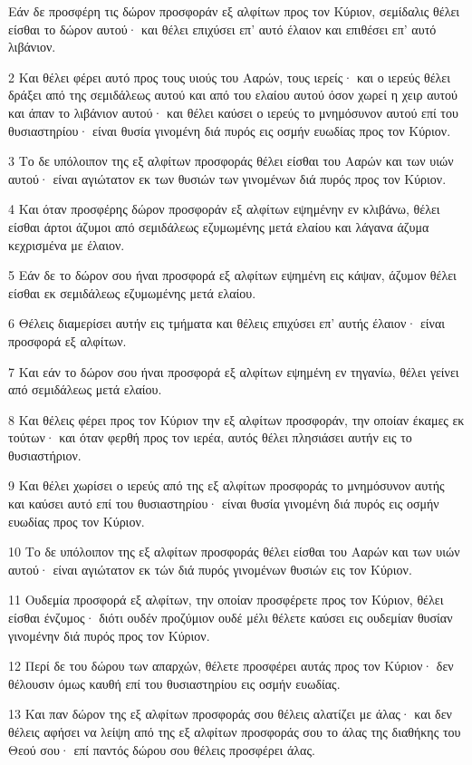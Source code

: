 \par Εάν δε προσφέρη τις δώρον προσφοράν εξ αλφίτων προς τον Κύριον, σεμίδαλις θέλει είσθαι το δώρον αυτού· και θέλει επιχύσει επ' αυτό έλαιον και επιθέσει επ' αυτό λιβάνιον.
\par 2 Και θέλει φέρει αυτό προς τους υιούς του Ααρών, τους ιερείς· και ο ιερεύς θέλει δράξει από της σεμιδάλεως αυτού και από του ελαίου αυτού όσον χωρεί η χειρ αυτού και άπαν το λιβάνιον αυτού· και θέλει καύσει ο ιερεύς το μνημόσυνον αυτού επί του θυσιαστηρίου· είναι θυσία γινομένη διά πυρός εις οσμήν ευωδίας προς τον Κύριον.
\par 3 Το δε υπόλοιπον της εξ αλφίτων προσφοράς θέλει είσθαι του Ααρών και των υιών αυτού· είναι αγιώτατον εκ των θυσιών των γινομένων διά πυρός προς τον Κύριον.
\par 4 Και όταν προσφέρης δώρον προσφοράν εξ αλφίτων εψημένην εν κλιβάνω, θέλει είσθαι άρτοι άζυμοι από σεμιδάλεως εζυμωμένης μετά ελαίου και λάγανα άζυμα κεχρισμένα με έλαιον.
\par 5 Εάν δε το δώρον σου ήναι προσφορά εξ αλφίτων εψημένη εις κάψαν, άζυμον θέλει είσθαι εκ σεμιδάλεως εζυμωμένης μετά ελαίου.
\par 6 Θέλεις διαμερίσει αυτήν εις τμήματα και θέλεις επιχύσει επ' αυτής έλαιον· είναι προσφορά εξ αλφίτων.
\par 7 Και εάν το δώρον σου ήναι προσφορά εξ αλφίτων εψημένη εν τηγανίω, θέλει γείνει από σεμιδάλεως μετά ελαίου.
\par 8 Και θέλεις φέρει προς τον Κύριον την εξ αλφίτων προσφοράν, την οποίαν έκαμες εκ τούτων· και όταν φερθή προς τον ιερέα, αυτός θέλει πλησιάσει αυτήν εις το θυσιαστήριον.
\par 9 Και θέλει χωρίσει ο ιερεύς από της εξ αλφίτων προσφοράς το μνημόσυνον αυτής και καύσει αυτό επί του θυσιαστηρίου· είναι θυσία γινομένη διά πυρός εις οσμήν ευωδίας προς τον Κύριον.
\par 10 Το δε υπόλοιπον της εξ αλφίτων προσφοράς θέλει είσθαι του Ααρών και των υιών αυτού· είναι αγιώτατον εκ τών διά πυρός γινομένων θυσιών εις τον Κύριον.
\par 11 Ουδεμία προσφορά εξ αλφίτων, την οποίαν προσφέρετε προς τον Κύριον, θέλει είσθαι ένζυμος· διότι ουδέν προζύμιον ουδέ μέλι θέλετε καύσει εις ουδεμίαν θυσίαν γινομένην διά πυρός προς τον Κύριον.
\par 12 Περί δε του δώρου των απαρχών, θέλετε προσφέρει αυτάς προς τον Κύριον· δεν θέλουσιν όμως καυθή επί του θυσιαστηρίου εις οσμήν ευωδίας.
\par 13 Και παν δώρον της εξ αλφίτων προσφοράς σου θέλεις αλατίζει με άλας· και δεν θέλεις αφήσει να λείψη από της εξ αλφίτων προσφοράς σου το άλας της διαθήκης του Θεού σου· επί παντός δώρου σου θέλεις προσφέρει άλας.
